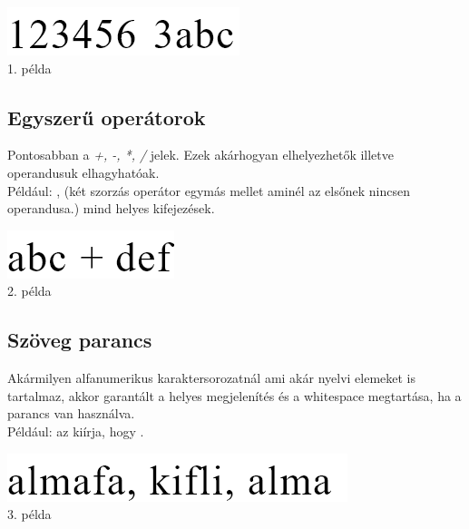 \documentclass[../spec.tex]{subfiles}
\begin{document}
    \begin{center}
        \includegraphics[scale=0.4]{./images/doc1.png}\\
        1. példa
    \end{center}

    \subsection{Egyszerű operátorok}\label{subsec:két-operandusu-egyszerű-operátorok}
    Pontosabban a \textit{+, -, *, /} jelek.
    Ezek akárhogyan elhelyezhetők illetve operandusuk elhagyhatóak. \\
    Például: \lang{[kif] + [kif]}, \lang{** [kif]} (két szorzás operátor egymás mellet aminél az elsőnek nincsen operandusa.) mind helyes kifejezések.

    \begin{center}
        \includegraphics[scale=0.4]{./images/doc2.png}\\
        2. példa
    \end{center}

    \subsection{Szöveg parancs}\label{subsec:szöveges-parancs}
    Akármilyen alfanumerikus karaktersorozatnál ami akár nyelvi elemeket is tartalmaz, akkor garantált a helyes megjelenítés és a whitespace megtartása, ha a  parancs van használva. \\
    Például:  az kiírja, hogy .

    \begin{center}
        \includegraphics[scale=0.4]{./images/doc3.png}\\
        3. példa
    \end{center}
\end{document}
